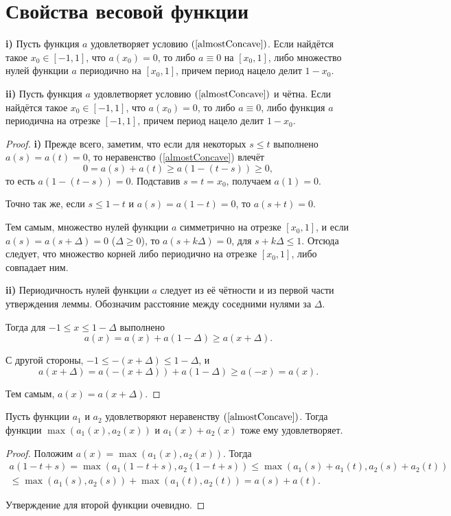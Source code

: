 \section{Свойства весовой функции}


\begin{lm}
\label{periodicity}
\textbf{\textup{i)}}
Пусть функция $a$ удовлетворяет условию $(\ref{almostConcave})$.
Если найдётся такое $x_0 \in [-1, 1]$, что $a(x_0) = 0$,
то либо $a \equiv 0$ на $[x_0, 1]$,
либо множество нулей функции $a$ периодично на $[x_0, 1]$, причем период нацело делит $1 - x_0$.

\textbf{\textup{ii)}}
Пусть функция $a$ удовлетворяет условию $(\ref{almostConcave})$ и чётна.
Если найдётся такое $x_0 \in [-1, 1]$, что $a(x_0) = 0$,
то либо $a \equiv 0$,
либо функция $a$ периодична на отрезке $[-1, 1]$, причем период нацело делит $1 - x_0$.
\end{lm}

\begin{proof}
\textbf{\textup{i)}}
Прежде всего, заметим, что если для некоторых $s \le t$ выполнено $a(s) = a(t) = 0$,
то неравенство (\ref{almostConcave}) влечёт
$$
0 = a(s) + a(t) \ge a(1 - (t - s)) \ge 0,
$$
то есть $a(1 - (t - s)) = 0$.
Подставив $s = t = x_0$, получаем $a(1) = 0$.

Точно так же, если $s \le 1 - t$ и $a(s) = a(1 - t) = 0$, то $a(s + t) = 0$.

Тем самым, множество нулей функции $a$ симметрично на отрезке $[x_0, 1]$,
и если $a(s) = a(s + \Delta) = 0$ ($\Delta \ge 0$),
то $a(s + k\Delta) = 0$, для $s + k\Delta \le 1$.
Отсюда следует, что множество корней либо периодично на отрезке $[x_0, 1]$, либо совпадает ним.

\textbf{\textup{ii)}}
Периодичность нулей функции $a$ следует из её чётности и из первой части утверждения леммы.
Обозначим расстояние между соседними нулями за $\Delta$.

Тогда для $-1 \le x \le 1 - \Delta$ выполнено
$$
a(x) = a(x) + a(1 - \Delta) \ge a(x + \Delta).
$$

С другой стороны, $-1 \le -(x + \Delta) \le 1 - \Delta$, и
$$
a(x + \Delta) = a(-(x + \Delta)) + a(1 - \Delta) \ge a(-x) = a(x).
$$

Тем самым, $a(x) = a(x + \Delta)$.
\end{proof}

\begin{lm}
\label{maxSumConcave}
Пусть функции $a_1$ и $a_2$ удовлетворяют неравенству $(\ref{almostConcave})$.
Тогда функции $\max (a_1(x), a_2(x))$ и $a_1(x) + a_2(x)$ тоже ему удовлетворяет.
\end{lm}
\begin{proof}
Положим $a(x) = \max (a_1(x), a_2(x))$.
Тогда
\begin{multline*}
a(1 - t + s) = \max(a_1( 1 - t + s), a_2(1 - t + s)) \le
\max(a_1(s) + a_1(t), a_2(s) + a_2(t)) \\
\le \max(a_1(s), a_2(s)) + \max(a_1(t), a_2(t)) =
a(s) + a(t).
\end{multline*}

Утверждение для второй функции очевидно.
\end{proof}

